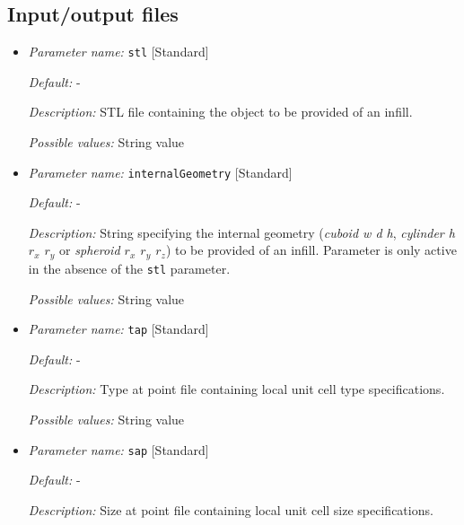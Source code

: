 \subsection{Input/output files} \label{parameters:files}
\begin{itemize}[itemsep=0.8em, parsep=0.3em]
	\item {\it Parameter name:} {\tt stl} \hfill [Standard]
	\label{parameters:stl}

	
	{\it Default:} -
	
	{\it Description:} STL file containing the object to be provided of an infill.
	
	{\it Possible values:} String value
	
	\item {\it Parameter name:} {\tt internalGeometry} \hfill [Standard]
	\label{parameters:internalGeometry}
	
	
	{\it Default:} -
	
	{\it Description:} String specifying the internal geometry ({\it cuboid w d h}, {\it cylinder h $r_x$ $r_y$} or {\it spheroid $r_x$ $r_y$ $r_z$}) to be provided of an infill. Parameter is only active in the absence of the {\tt stl} parameter.
	
	{\it Possible values:} String value
	
	\item {\it Parameter name:} {\tt tap} \hfill [Standard]
	\label{parameters:tap}
	
	
	{\it Default:} -
	
	{\it Description:} Type at point file containing local unit cell type specifications.
	
	{\it Possible values:} String value
	
	\item {\it Parameter name:} {\tt sap} \hfill [Standard]
	\label{parameters:sap}
	
	
	{\it Default:} -
	
	{\it Description:} Size at point file containing local unit cell size specifications.
	

\end{itemize}

